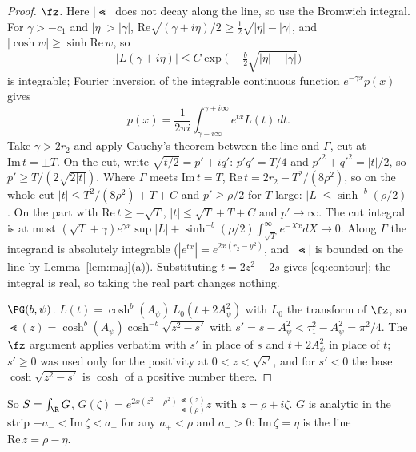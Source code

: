 \begin{proof}
\emph{$\fz$.} Here $|\Lt|$ does not decay along the line, so use the Bromwich integral. For $\gamma>-c_1$
and $|\eta|>|\gamma|$, $\mathrm{Re}\sqrt{(\gamma+i\eta)/2}\ge\frac12\sqrt{|\eta|-|\gamma|}$, and
$|\cosh w|\ge\sinh\mathrm{Re}\,w$, so
\[|L(\gamma+i\eta)|\le C\exp\bigl(-\tfrac b2\sqrt{|\eta|-|\gamma|}\bigr)\]
is integrable; Fourier
inversion of the integrable continuous function $e^{-\gamma x}p(x)$ gives
\[p(x)=\frac1{2\pi i}\int_{\gamma-i\infty}^{\gamma+i\infty}e^{tx}L(t)\,dt.\]
Take $\gamma>2r_2$ and apply Cauchy's theorem between the line
and $\Gamma$, cut at $\mathrm{Im}\,t=\pm T$. On the cut, write $\sqrt{t/2}=p'+iq'$: $p'q'=T/4$ and $p'^2+q'^2=|t|/2$,
so $p'\ge T/(2\sqrt{2|t|})$. Where $\Gamma$ meets $\mathrm{Im}\,t=T$, $\mathrm{Re}\,t=2r_2-T^2/(8\rho^2)$, so on the
whole cut $|t|\le T^2/(8\rho^2)+T+C$ and $p'\ge\rho/2$ for $T$ large: $|L|\le\sinh^{-b}(\rho/2)$. On the part with
$\mathrm{Re}\,t\ge-\sqrt T$, $|t|\le\sqrt T+T+C$ and $p'\to\infty$. The cut integral is at most
$(\sqrt T+\gamma)e^{\gamma x}\sup|L|+\sinh^{-b}(\rho/2)\int_{\sqrt T}^\infty e^{-Xx}dX\to0$. Along $\Gamma$ the
integrand is absolutely integrable ($|e^{tx}|=e^{2x(r_2-y^2)}$, and $|\Lt|$ is bounded on the line by
Lemma~\ref{lem:maj}(a)). Substituting $t=2z^2-2s$ gives \eqref{eq:contour}; the integral is real, so taking the
real part changes nothing.

\emph{$\PG(b,\psi)$.} $L(t)=\cosh^b(A_\psi)\,L_0(t+2A_\psi^2)$ with $L_0$ the transform of $\fz$, so
$\Lt(z)=\cosh^b(A_\psi)\cosh^{-b}\sqrt{z^2-s'}$ with $s'=s-A_\psi^2<\tau_1^2-A_\psi^2=\pi^2/4$. The $\fz$ argument
applies verbatim with $s'$ in place of $s$ and $t+2A_\psi^2$ in place of $t$; $s'\ge0$ was used only for the
positivity at $0<z<\sqrt{s'}$, and for $s'<0$ the base $\cosh\sqrt{z^2-s'}$ is $\cosh$ of a positive number there.
\end{proof}

So $S=\int_\R G$, $G(\zeta)=e^{2x(z^2-\rho^2)}\frac{\Lt(z)}{\Lt(\rho)}z$ with $z=\rho+i\zeta$. $G$ is analytic in
the strip $-a_-<\mathrm{Im}\,\zeta<a_+$ for any $a_+<\rho$ and $a_->0$: $\mathrm{Im}\,\zeta=\eta$ is the line
$\mathrm{Re}\,z=\rho-\eta$.


